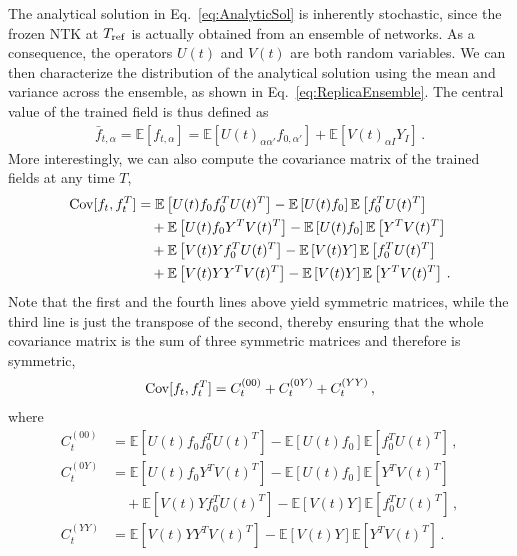 The analytical solution in Eq.~\eqref{eq:AnalyticSol} is inherently stochastic,
since the frozen NTK at $T_{\rm ref}$ is actually obtained from an ensemble of
networks. As a consequence, the operators $U(t)$ and $V(t)$ are both random
variables. We can then characterize the distribution of the analytical solution
using the mean and variance across the ensemble, as shown in
Eq.~\eqref{eq:ReplicaEnsemble}. The central value of the trained field is thus
defined as
\begin{align}
    \label{eq:MeanValAtT}
    \bar{f}_{t,\alpha} = \mathbb{E}\left[f_{t,\alpha}\right]
        = \mathbb{E}\left[U(t)_{\alpha\alpha'} f_{0,\alpha'}\right]
            + \mathbb{E}\left[V(t)_{\alpha I} Y_I\right] \, .
\end{align}
More interestingly, we can also compute the covariance matrix of the trained
fields at any time $T$,
\begin{align}
    \mathrm{Cov}[f_t,f_t^T]
        &= \mathbb{E}\left[U(t) f_0 f_0^T U(t)^T\right] 
            - \mathbb{E}\left[U(t) f_0\right] \mathbb{E}\left[f_0^T U(t)^T\right]  \nonumber \\
        &\quad + \mathbb{E}\left[U(t) f_0 Y^T V(t)^T\right] 
            - \mathbb{E}\left[U(t) f_0\right] \mathbb{E}\left[Y^T V(t)^T\right] \nonumber \\
        &\quad + \mathbb{E}\left[V(t) Y f_0^T U(t)^T\right]
            - \mathbb{E}\left[V(t) Y\right] \mathbb{E}\left[f_0^T U(t)^T\right] \nonumber \\
    \label{eq:CovAtT}
        &\quad + \mathbb{E}\left[V(t) Y Y^T V(t)^T\right]
            - \mathbb{E}\left[V(t) Y\right] \mathbb{E}\left[Y^T V(t)^T\right] \, .
\end{align}
Note that the first and the fourth lines above yield symmetric matrices, while
the third line is just the transpose of the second, thereby ensuring that the
whole covariance matrix is the sum of three symmetric matrices and therefore is
symmetric, 
\begin{align}
    \label{eq:SumOfCovariances}
    \mathrm{Cov}[f_t,f_t^T] = C_t^{(00)} + C_t^{(0Y)} + C_t^{(YY)}\, ,
\end{align}
where
\begin{align}
    \label{eq:C00term}
    C_t^{(00)} 
        &= \mathbb{E}\left[U(t) f_0 f_0^T U(t)^T\right] 
        - \mathbb{E}\left[U(t) f_0\right] \mathbb{E}\left[f_0^T U(t)^T\right]\, ,\\
    C_t^{(0Y)}
        &= \mathbb{E}\left[U(t) f_0 Y^T V(t)^T\right] 
        - \mathbb{E}\left[U(t) f_0\right] \mathbb{E}\left[Y^T V(t)^T\right] \nonumber \\
        \label{eq:C0Yterm}
        &\quad + \mathbb{E}\left[V(t) Y f_0^T U(t)^T\right]
            - \mathbb{E}\left[V(t) Y\right] \mathbb{E}\left[f_0^T U(t)^T\right] \, ,\\
    C_t^{(YY)}
        &= \mathbb{E}\left[V(t) Y Y^T V(t)^T\right]
        - \mathbb{E}\left[V(t) Y\right] \mathbb{E}\left[Y^T V(t)^T\right]\, .
\end{align}
